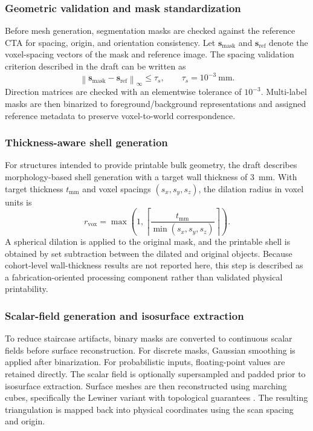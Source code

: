 \documentclass[anonymous]{iopjournal}
\begin{document}
\subsubsection{Geometric validation and mask standardization}

Before mesh generation, segmentation masks are checked against the reference CTA for spacing, origin, and orientation consistency. Let $\mathbf{s}_{\mathrm{mask}}$ and $\mathbf{s}_{\mathrm{ref}}$ denote the voxel-spacing vectors of the mask and reference image. The spacing validation criterion described in the draft can be written as
\begin{equation}
\left\lVert \mathbf{s}_{\mathrm{mask}} - \mathbf{s}_{\mathrm{ref}} \right\rVert_{\infty}
\leq \tau_s,
\qquad
\tau_s = 10^{-3}\ \mathrm{mm}.
\label{eq:spacing}
\end{equation}
Direction matrices are checked with an elementwise tolerance of $10^{-3}$. Multi-label masks are then binarized to foreground/background representations and assigned reference metadata to preserve voxel-to-world correspondence.

\subsubsection{Thickness-aware shell generation}

For structures intended to provide printable bulk geometry, the draft describes morphology-based shell generation with a target wall thickness of \SI{3}{mm}. With target thickness $t_{\mathrm{mm}}$ and voxel spacings $(s_x,s_y,s_z)$, the dilation radius in voxel units is
\begin{equation}
r_{\mathrm{vox}}
=
\max
\left(
1,
\left\lceil
\frac{t_{\mathrm{mm}}}{\min(s_x,s_y,s_z)}
\right\rceil
\right).
\label{eq:dilation}
\end{equation}
A spherical dilation is applied to the original mask, and the printable shell is obtained by set subtraction between the dilated and original objects. Because cohort-level wall-thickness results are not reported here, this step is described as a fabrication-oriented processing component rather than validated physical printability.

\subsubsection{Scalar-field generation and isosurface extraction}

To reduce staircase artifacts, binary masks are converted to continuous scalar fields before surface reconstruction. For discrete masks, Gaussian smoothing is applied after binarization. For probabilistic inputs, floating-point values are retained directly. The scalar field is optionally supersampled and padded prior to isosurface extraction. Surface meshes are then reconstructed using marching cubes, specifically the Lewiner variant with topological guarantees \cite{lorensen1987,lewiner2003}. The resulting triangulation is mapped back into physical coordinates using the scan spacing and origin.
\end{document}
